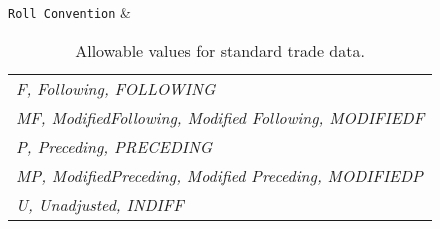 \begin{table}[H]
\begin{tabu}
    \lstinline!Roll Convention! & \begin{tabular}[l]{@{}l@{}} \emph{F, Following, FOLLOWING}\\ \emph{MF, ModifiedFollowing, Modified Following, MODIFIEDF}\\ \emph{P, Preceding, PRECEDING}\\ \emph{MP, ModifiedPreceding, Modified Preceding, MODIFIEDP}\\ \emph{U, Unadjusted, INDIFF }\end{tabular}  \\ \hline
  \end{tabu}
  \caption{Allowable values for standard trade data.}
  \label{tab:allow_stand_data}
\end{table}

